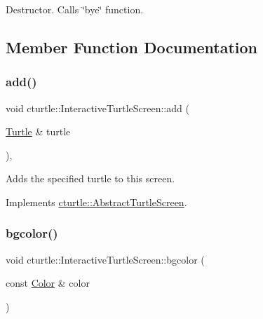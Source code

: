 Destructor. Calls \char`\"{}bye\char`\"{} function. 

\subsection{Member Function Documentation}
\mbox{\label{classcturtle_1_1InteractiveTurtleScreen_ab9696275e4a7b10225cfe10e48fd8c89}} 
\subsubsection{\texorpdfstring{add()}{add()}}
{\footnotesize\ttfamily void cturtle\+::\+Interactive\+Turtle\+Screen\+::add (\begin{DoxyParamCaption}\item[{\hyperlink{classcturtle_1_1Turtle}{Turtle} \&}]{turtle }\end{DoxyParamCaption})\hspace{0.3cm}{\ttfamily [inline]}, {\ttfamily [virtual]}}

Adds the specified turtle to this screen. 

Implements \hyperlink{classcturtle_1_1AbstractTurtleScreen}{cturtle\+::\+Abstract\+Turtle\+Screen}.

\mbox{\label{classcturtle_1_1InteractiveTurtleScreen_acb5441704b45a01830d69df46a23732f}} 
\subsubsection{\texorpdfstring{bgcolor()}{bgcolor()}\hspace{0.1cm}{\footnotesize\ttfamily [1/2]}}
{\footnotesize\ttfamily void cturtle\+::\+Interactive\+Turtle\+Screen\+::bgcolor (\begin{DoxyParamCaption}\item[{const \hyperlink{classcturtle_1_1Color}{Color} \&}]{color }\end{DoxyParamCaption})\hspace{0.3cm}{\ttfamily [virtual]}}

